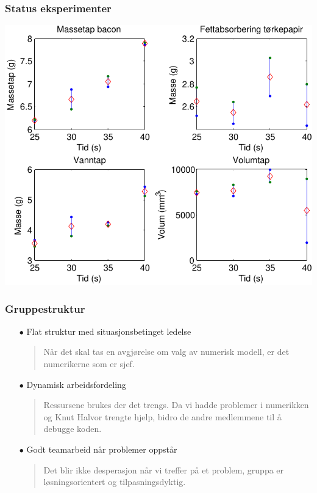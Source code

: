 \documentclass[screen]{beamer}
\begin{document}
\begin{frame}
  \frametitle{Status eksperimenter}
    \begin{center}
      \includegraphics[width=0.7\linewidth]{eksperiment.pdf}
    \end{center}
\end{frame}

\begin{frame}
  \frametitle{Gruppestruktur}
  \begin{itemize}
    \item[$\bullet$] Flat struktur med situasjonsbetinget ledelse
	\begin{quote}{
	  \tiny
	Når det skal tas en avgjørelse om valg av numerisk modell, er det
	numerikerne som er sjef.}
	\end{quote}
    \item[$\bullet$] Dynamisk arbeidsfordeling 
      \begin{quote}{
	\tiny
	Ressursene brukes der det trengs. Da vi hadde problemer i numerikken og
	Knut Halvor trengte hjelp, bidro de andre medlemmene til å debugge
	koden.}
	\end{quote}
    \item[$\bullet$] Godt teamarbeid når problemer oppstår
      \begin{quote}{
	\tiny
        Det blir ikke desperasjon når vi treffer på et problem, gruppa er
	løsningsorientert og tilpasningsdyktig.}
      \end{quote}
  \end{itemize}
\end{frame}
\end{document}
